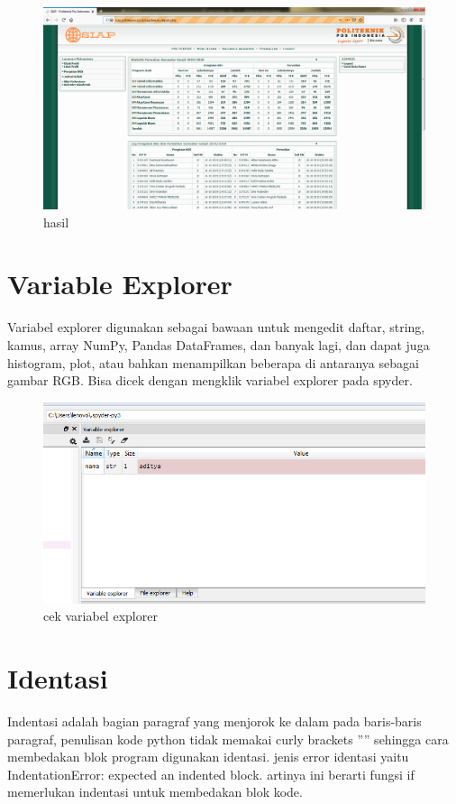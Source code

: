 	\begin{figure}
	\includegraphics[scale=0.3]{section/hasil.png}
	\centering
	\caption{hasil}
	\end{figure}

\section{Variable Explorer}
Variabel explorer digunakan sebagai bawaan untuk mengedit daftar, string, kamus, array NumPy, Pandas DataFrames, dan banyak lagi, dan dapat juga histogram, plot, atau bahkan menampilkan beberapa di antaranya sebagai gambar RGB. Bisa dicek dengan mengklik variabel explorer pada spyder.

	\begin{figure}
	\includegraphics[scale=0.3]{section/variabel_explorer.png}
	\centering
	\caption{cek variabel explorer}
	\end{figure}
	
\section{Identasi}
Indentasi adalah bagian paragraf yang menjorok ke dalam pada baris-baris
paragraf, penulisan kode python tidak memakai curly brackets ”{}” sehingga
cara membedakan blok program digunakan identasi.
jenis error identasi yaitu IndentationError: expected an indented block.
artinya ini berarti fungsi if memerlukan indentasi untuk membedakan blok
kode.

